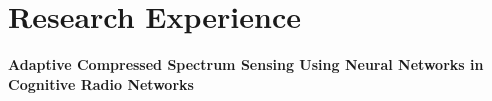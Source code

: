 \documentclass[letterpaper,6pt]{article}
\newcommand{\resumeSubHeadingListStart}{\begin{itemize}[leftmargin=0.15in, label={},partopsep=0.05pt]
\setlength\itemsep{1em}
}
\newcommand{\resumeSubHeadingListEnd}{\end{itemize}}
\begin{document}
\section{Research Experience}
  \hspace{-5pt} \textbf{\footnotesize{Adaptive Compressed Spectrum Sensing Using Neural Networks in Cognitive Radio Networks \emph{\href{https://doi.org/10.1080/03772063.2021.1929516}{\color{blue}\faPaperclip
}}}}
      
     
      
    


        
    


\vspace{-10pt}


\end{document}
